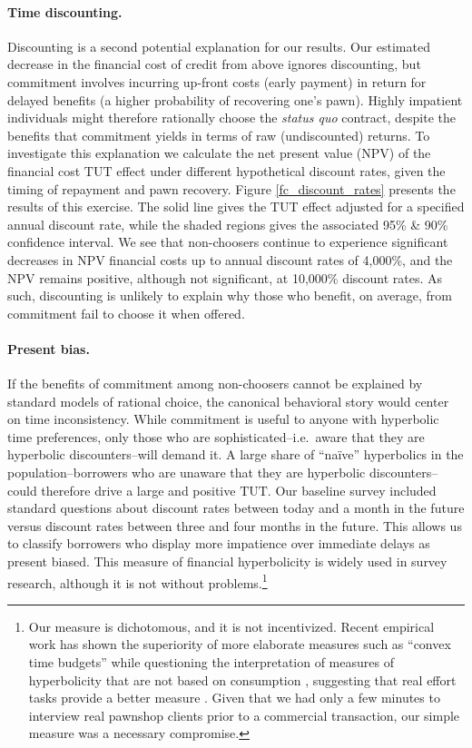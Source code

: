 \documentclass[oneside,11pt]{article}
\begin{document}
\paragraph{Time discounting.} Discounting is a second potential explanation for our results.  Our estimated decrease in the financial cost of credit from above ignores discounting, but commitment involves incurring up-front costs (early payment) in return for delayed benefits (a higher probability of recovering one's pawn).  Highly impatient individuals might therefore rationally choose the \emph{status quo} contract, despite the benefits that commitment yields in terms of raw (undiscounted) returns. To investigate this explanation we calculate the net present value (NPV) of the financial cost $\text{TUT}$ effect under different hypothetical discount rates, given the timing of repayment and pawn recovery. Figure \ref{fc_discount_rates} presents the results of this exercise. 
The solid line gives the TUT effect adjusted for a specified annual discount rate, while the shaded regions gives the associated 95\% \& 90\% confidence interval.
We see that non-choosers continue to experience significant decreases in NPV financial costs up to annual discount rates of 4,000\%, and the NPV remains positive, although not significant, at 10,000\% discount rates.  As such, discounting is unlikely to explain why those who benefit, on average, from commitment fail to choose it when offered. 



\paragraph{Present bias.} If the benefits of commitment among non-choosers cannot be explained by standard models of rational choice, the canonical behavioral story would center on time inconsistency.  While commitment is useful to anyone with hyperbolic time preferences, only those who are sophisticated--i.e.\ aware that they are hyperbolic discounters--will demand it.  A large share of ``na\"ive'' hyperbolics in the population--borrowers who are unaware that they are hyperbolic discounters--could therefore drive a large and positive $\text{TUT}$.  Our baseline survey included standard questions about discount rates between today and a month in the future versus discount rates between three and four months in the future.
This allows us to classify borrowers who display more impatience over immediate delays as present biased. This measure of financial hyperbolicity is widely used in survey research, although it is not without problems.\footnote{Our measure is dichotomous, and it is not incentivized. Recent empirical work has shown the superiority of more elaborate measures such as ``convex time budgets'' \citep{andreoni2015measuring} while questioning the interpretation of measures of hyperbolicity that are not based on consumption \citep{andreoni2012estimating, cohen2020measuring}, suggesting that real effort tasks provide a better measure \citep{augenblick2015working}.  Given that we had only a few minutes to interview real pawnshop clients prior to a commercial transaction, our simple measure was a necessary compromise.}   
\end{document}
